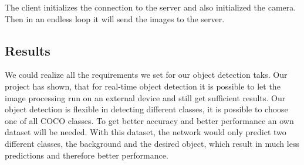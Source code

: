 The client initializes the connection to the server and also initialized the camera. Then in an endless loop it will send the images to the server.

\subsection{Results}

We could realize all the requirements we set for our object detection taks. Our project has shown, that for real-time object detection it is possible to let the image processing run on an external device and still get sufficient results. Our object detection is flexible in detecting different classes, it is possible to choose one of all COCO classes. To get better accuracy and better performance an own dataset will be needed. With this dataset, the network would only predict two different classes, the background and the desired object, which result in much less predictions and therefore better performance.
